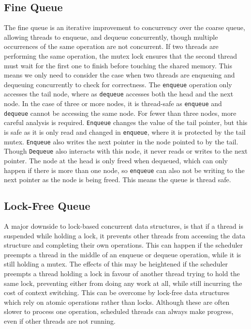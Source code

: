 \documentclass{article}
\begin{document}
\subsection{Fine Queue}
The fine queue is an iterative improvement to concurrency over the coarse queue,
allowing threads to enqueue, and dequeue concurrently, though multiple
occurrences of the same operation are not concurrent. If two threads are
performing the same operation, the mutex lock ensures that the second thread
must wait for the first one to finish before touching the shared memory. This
means we only need to consider the case when two threads are enqueuing and
dequeuing concurrently to check for correctness. The \verb|enqueue| operation
only accesses the tail node, where as \verb|dequeue| accesses both the head and
the next node. In the case of three or more nodes, it is thread-safe as
\verb|enqueue| and \verb|dequeue| cannot be accessing the same node. For fewer
than three nodes, more careful analysis is required. \verb|Enqueue| changes the
value of the tail pointer, but this is safe as it is only read and changed in
\verb|enqueue|, where it is protected by the tail mutex. \verb|Enqueue| also
writes the next pointer in the node pointed to by the tail. Though
\verb|Dequeue| also interacts with this node, it never reads or writes to the
next pointer. The node at the head is only freed when dequeued, which can only
happen if there is more than one node, so \verb|enqueue| can also not be writing
to the next pointer as the node is being freed. This means the queue is thread
safe.

\subsection{Lock-Free Queue}
A major downside to lock-based concurrent data structures, is that if a thread
is suspended while holding a lock, it prevents other threads from accessing the
data structure and completing their own operations. This can happen if the
scheduler preempts a thread in the middle of an enqueue or dequeue operation,
while it is still holding a mutex. The effects of this may be heightened if the
scheduler preempts a thread holding a lock in favour of another thread trying to
hold the same lock, preventing either from doing any work at all, while still
incurring the cost of context switching. This can be overcome by lock-free
data structures which rely on atomic operations rather than locks. Although
these are often slower to process one operation, scheduled threads can always
make progress, even if other threads are not running. 
\end{document}
